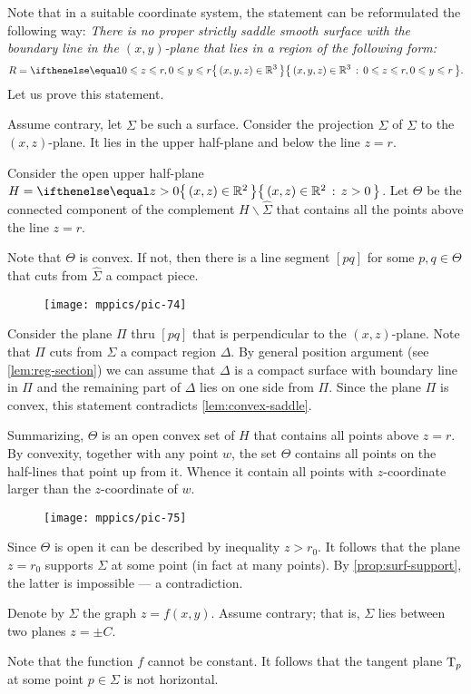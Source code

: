 Note that in a suitable coordinate system, the statement can be reformulated the following way:
\emph{There is no proper strictly saddle smooth surface 
with the boundary line in the $(x,y)$-plane
that lies in a region of the following form:}
\[R=\set{(x,y,z)\in\RR^3}{0\le z\le r, 0\le y\le r}.\]
Let us prove this statement.

Assume contrary, let $\Sigma$ be such a surface.
Consider the projection $\hat \Sigma$ of $\Sigma$ to the $(x,z)$-plane.
It lies in the upper half-plane and below the line $z=r$.

Consider the open upper half-plane $H=\set{(x,z)\in \RR^2}{z> 0}$. 
Let $\Theta$ be the connected component of the complement $H\backslash \hat \Sigma$ that contains all the points above the line $z=r$.

Note that $\Theta$ is convex.
If not, then there is a line segment $[pq]$ for some $p,q\in \Theta$ that cuts from $\hat\Sigma$ a compact piece.
\begin{figure}[h!]
\vskip-0mm
\centering
\texttt{[image: mppics/pic-74]}
\vskip0mm
\end{figure}
Consider the plane $\Pi$ thru $[pq]$ that is perpendicular to the $(x,z)$-plane.
Note that $\Pi$ cuts from $\Sigma$ a compact region $\Delta$.
By general position argument (see \ref{lem:reg-section}) 
we can assume that $\Delta$ is a compact surface with boundary line in $\Pi$ and the remaining part of $\Delta$ lies on one side from $\Pi$.
Since the plane $\Pi$ is convex, this statement contradicts \ref{lem:convex-saddle}.

Summarizing, $\Theta$ is an open convex set of $H$ that contains all points above $z=r$.
By convexity, together with any point $w$, the set $\Theta$ contains all points on the half-lines that point up from it. 
Whence it contain all points with $z$-coordinate larger than the $z$-coordinate of $w$.
\begin{figure}[h!]
\vskip-0mm
\centering
\texttt{[image: mppics/pic-75]}
\vskip0mm
\end{figure}
Since $\Theta$ is open it can be described by inequality $z>r_0$.
It follows that the plane $z=r_0$ supports $\Sigma$ at some point (in fact at many points).
By \ref{prop:surf-support}, the latter is impossible --- a contradiction.
\qeds

Denote by $\Sigma$ the graph $z=f(x,y)$.
Assume contrary; that is, $\Sigma$ lies between two planes $z=\pm C$.

Note that the function $f$ cannot be constant.
It follows that the tangent plane $\mathrm{T}_p$ at some point $p\in\Sigma$ is not horizontal.

